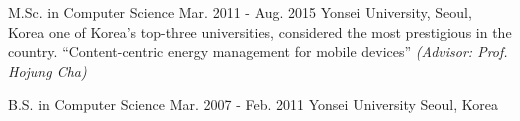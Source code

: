 

\begin{cventries}
    \cveducationentry
        {M.Sc. in Computer Science} %
        {Mar. 2011 - Aug. 2015} %
        {Yonsei University, } %
        {Seoul, Korea} %
        {one of Korea's top-three universities, considered the most prestigious in the country.} %
        {``Content-centric energy management for mobile devices'' {\em (Advisor: Prof. Hojung Cha)}}
        {} %
        
    \cveducationentry
        {B.S. in Computer Science} %
        {Mar. 2007 - Feb. 2011} %
        {Yonsei University} %
        {Seoul, Korea} %
        {} %
        {} %
        {} %
\end{cventries}
